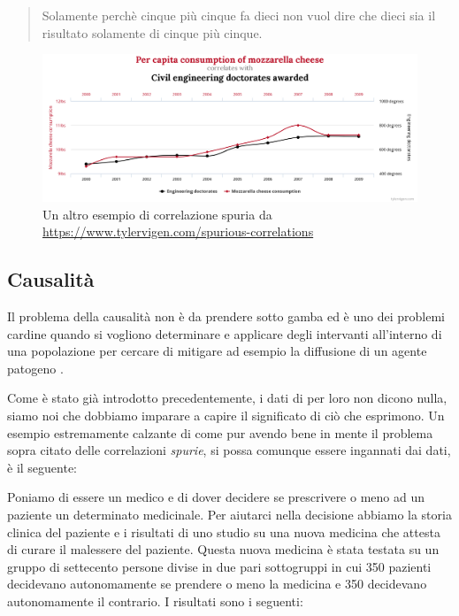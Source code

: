\begin{quotation}
    Solamente perchè cinque più cinque fa dieci non vuol dire che 
dieci sia il risultato solamente di cinque più cinque.
\end{quotation}

\begin{figure}[h]
    \begin{center}
        \includegraphics[width=\linewidth]{img/chart1.png}
        \caption{Un altro esempio di correlazione spuria da 
        \url{https://www.tylervigen.com/spurious-correlations}}
        \label{fig:another_spurious_relations}
    \end{center}
\end{figure}

\newpage

\subsection{Causalità}
Il problema della causalità non è da prendere sotto gamba
ed è uno dei problemi cardine quando si vogliono determinare e 
applicare degli intervanti all'interno di una popolazione per
cercare di mitigare ad esempio la diffusione di un agente 
patogeno \cite{Parascandola2001-kw}. 

Come è stato già introdotto precedentemente, i dati di per loro
non dicono nulla, siamo noi che dobbiamo imparare a 
capire il significato di ciò che esprimono. Un esempio 
estremamente calzante di come pur avendo bene in mente il
problema sopra citato delle correlazioni \emph{spurie}, si
possa comunque essere ingannati dai dati, è il seguente:

Poniamo di essere un medico e di dover decidere se 
prescrivere o meno ad un paziente un determinato medicinale.
Per aiutarci nella decisione abbiamo la storia clinica
del paziente e i risultati di uno studio su una nuova 
medicina che attesta di curare il malessere del paziente.
Questa nuova medicina è stata testata su un gruppo di 
settecento persone divise in due pari sottogruppi in cui 
350 pazienti decidevano autonomamente se prendere o meno 
la medicina e 350 decidevano autonomamente il contrario.
I risultati sono i seguenti:

